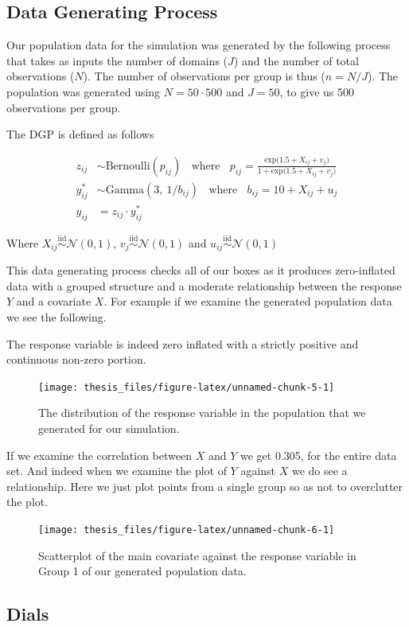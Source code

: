 \documentclass[12pt,twoside]{reedthesis}
\begin{document}
\hypertarget{data-generating-process}{%
\subsection{Data Generating Process}\label{data-generating-process}}

Our population data for the simulation was generated by the following process that takes as inputs the number of domains (\(J\)) and the number of total observations (\(N\)). The number of observations per group is thus (\(n = N/J\)). The population was generated using \(N = 50\cdot 500\) and \(J = 50\), to give us 500 observations per group.

The DGP is defined as follows

\[
\begin{aligned}
z_{ij} &\sim \text{Bernoulli}(p_{ij}) \ \ \ \ \text{where} \ \ \ \ p_{ij} = \frac{\text{exp}\big(1.5 + X_{ij} + v_j\big)}{1 + \text{exp}\big(1.5 + X_{ij} + v_j\big)} \\
y^*_{ij} &\sim \text{Gamma}(3, \  1/b_{ij}) \ \ \ \ \text{where} \ \ \ \ b_{ij} = 10 + X_{ij} + u_{j} \\
y_{ij} &=z_{ij}\cdot y^*_{ij}
\end{aligned}
\]

Where \(X_{ij} \overset{\text{iid}}{\sim} \mathcal{N}(0, 1)\), \(v_j \overset{\text{iid}}{\sim} \mathcal{N}(0, 1)\) and \(u_{ij} \overset{\text{iid}}{\sim} \mathcal{N}(0, 1)\)

This data generating process checks all of our boxes as it produces zero-inflated data with a grouped structure and a moderate relationship between the response \(Y\) and a covariate \(X\). For example if we examine the generated population data we see the following.

The response variable is indeed zero inflated with a strictly positive and continuous non-zero portion.
\begin{figure}

{\centering \texttt{[image: thesis\_files/figure-latex/unnamed-chunk-5-1]} 

}

\caption{The distribution of the response variable in the population that we generated for our simulation.}\label{fig:unnamed-chunk-5}
\end{figure}
If we examine the correlation between \(X\) and \(Y\) we get 0.305, for the entire data set. And indeed when we examine the plot of \(Y\) against \(X\) we do see a relationship. Here we just plot points from a single group so as not to overclutter the plot.
\begin{figure}

{\centering \texttt{[image: thesis\_files/figure-latex/unnamed-chunk-6-1]} 

}

\caption{Scatterplot of the main covariate against the response variable in Group 1 of our generated population data.}\label{fig:unnamed-chunk-6}
\end{figure}
\hypertarget{dials}{%
\subsection{Dials}\label{dials}}
\end{document}
